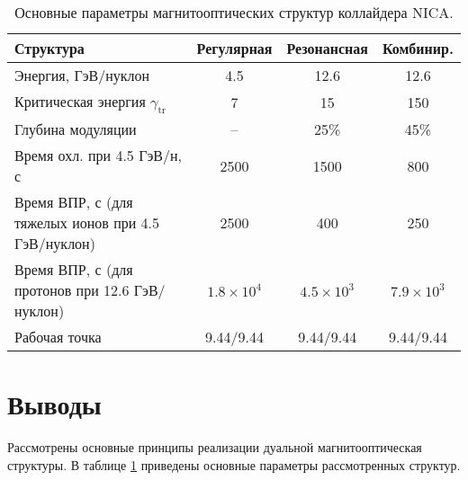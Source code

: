 \begin{table}[h!]
	\centering
	\begin{tabular}{|l|c|c|c|}
		\hline
		\textbf{Структура} & \textbf{Регулярная} & \textbf{Резонансная} & \textbf{Комбинир.} \\
		\hline
		Энергия, ГэВ/нуклон & 4.5 & 12.6 & 12.6 \\
		\hline
		Критическая энергия $\gamma_{\text{tr}}$ & 7 & 15 & 150 \\
		\hline
		Глубина модуляции & -- & 25\% & 45\% \\
		\hline
		Время охл. при 4.5 ГэВ/н, с & 2500 & 1500 & 800 \\
		\hline
		\parbox{7cm}{Время ВПР, с (для тяжелых ионов при 4.5 ГэВ/нуклон)} & 2500 & 400 & 250 \\
		\hline
		\parbox{7cm}{Время ВПР, с (для протонов при 12.6 ГэВ/нуклон)} & $1.8 \times 10^4$ & $4.5 \times 10^3$ & $7.9 \times 10^3$ \\
		\hline
		Рабочая точка & 9.44/9.44 & 9.44/9.44 & 9.44/9.44 \\
		\hline
	\end{tabular}
	\caption{Основные параметры магнитооптических структур коллайдера NICA.}
	\label{tab:dual}
\end{table}

\section*{Выводы}
\par Рассмотрены основные принципы реализации дуальной магнитооптическая структуры. 
В таблице \ref{tab:dual} приведены основные параметры рассмотренных структур.

